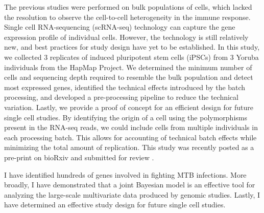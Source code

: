 The previous studies were performed on bulk populations of cells,
which lacked the resolution to observe the cell-to-cell heterogeneity
in the immune response. Single cell RNA-sequencing (scRNA-seq)
technology can capture the gene expression profile of individual
cells. However, the technology is still relatively new, and best
practices for study design have yet to be established. In this study,
we collected 3 replicates of induced pluripotent stem cells (iPSCs)
from 3 Yoruba individuals from the HapMap Project. We determined the
minimum number of cells and sequencing depth required to resemble the
bulk population and detect most expressed genes, identified the
technical effects introduced by the batch processing, and developed a
pre-processing pipeline to reduce the technical variation. Lastly, we
provide a proof of concept for an efficient design for future single
cell studies. By identifying the origin of a cell using the
polymorphisms present in the RNA-seq reads, we could include cells
from multiple individuals in each processing batch. This allows for
accounting of technical batch effects while minimizing the total
amount of replication. This study was recently posted as a pre-print
on bioRxiv and submitted for review \citep{Tung2016}.

I have identified hundreds of genes involved in fighting MTB
infections.  More broadly, I have demonstrated that a joint Bayesian
model is an effective tool for analyzing the large-scale multivariate
data produced by genomic studies. Lastly, I have determined an
effective study design for future single cell studies.

